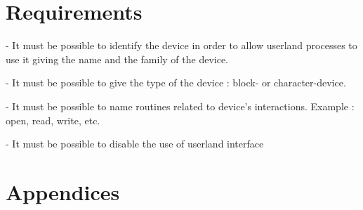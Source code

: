 \documentclass[11pt]{report}
\begin{document}
\section{Requirements}
\begin{description}
  \item{- It must be possible to identify the device in order to allow userland processes to use it giving the name and the family of the device.}
  \item{- It must be possible to give the type of the device : block- or character-device.}
  \item{- It must be possible to name routines related to device's interactions. Example : open, read, write, etc.}
  \item{- It must be possible to disable the use of userland interface}
\end{description}

\newpage
\section{Appendices}
\end{document}
